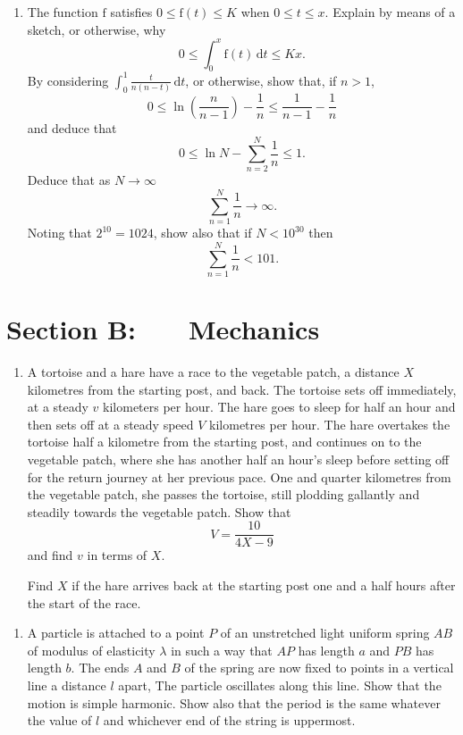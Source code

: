 \documentclass[a4, 11pt]{report}
\newlength{\qspace}
\newcounter{qnumber}
\newenvironment{question}%
 {\vspace{\qspace}
  \begin{enumerate}[\bfseries 1\quad][10]%
    \setcounter{enumi}{\value{qnumber}}%
    \item%
 }
{
  \end{enumerate}
  \filbreak
  \stepcounter{qnumber}
 }
\def\f{{\mathrm f}}
\def\le{\leqslant}
\begin{document}
\begin{question}	
The function $\f$ satisfies  $0\leqslant\f(t)\leqslant K$
when $0\leqslant t\leqslant x$. Explain by means of a sketch, or
otherwise,  why  
\[0\leqslant\int_{0}^{x} \f (t)\,{\mathrm d}t
\leqslant Kx.\]
By considering 
$\displaystyle \int_{0}^{1}\frac{t}{n(n-t)}\,{\mathrm d}t$, or otherwise,
show that, if $n>1$,
\[
0\le \ln \left( \frac n{n-1}\right)  -\frac 1n \le \frac 1 {n-1} - \frac 1n
\]
and deduce that
\[
0\le \ln N -\sum_{n=2}^N \frac1n  \le 1.
\]
Deduce that as $N\to \infty$
\[
 \sum_{n=1}^N \frac1n \to\infty.
\]
Noting that $2^{10}=1024$, show also that  if $N<10^{30}$ then
\[
 \sum_{n=1}^N \frac1n <101.
\]

\end{question}	
		

		
	
\newpage
\section*{Section B: \ \ \ Mechanics}


	
\begin{question}
A tortoise and a hare have a race to the vegetable patch, a
distance $X$ kilometres from the starting post, and back.
The tortoise sets off immediately, at a steady $v$ kilometers per
hour. The hare goes to sleep for half an hour and then sets off
at a steady speed $V$ kilometres per hour. The hare overtakes
the tortoise half a kilometre from the starting post, and continues
on to the vegetable patch, where she has another half an hour's 
sleep before setting  off for the return journey
at her previous pace. One and quarter kilometres from the 
vegetable patch, she 
passes the tortoise, still plodding gallantly and steadily 
towards the vegetable 
patch. Show that 
\[
V= \frac{10}{4X-9}
\]
and find
$v$ in terms of $X$. 

Find $X$ if
the hare  arrives back at the starting post
one and a half  hours after the start of the race.
	\end{question}
	
\begin{question}	
A particle is attached to a point $P$ of an 
unstretched light uniform
spring $AB$ of modulus of elasticity $\lambda$ in such a way that
$AP$ has length $a$ and $PB$ has length $b$.
The ends $A$ and $B$ of the spring are
now fixed to points in a vertical line a distance $l$ apart,
The particle oscillates
along this line. Show that
the motion is simple harmonic. Show also that the period
is the same whatever the value of $l$
 and whichever end of the string is uppermost.
\end{question}
\end{document}
